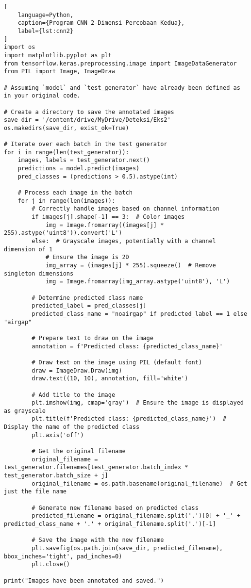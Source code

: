 \begin{lstlisting}[
    language=Python,
    caption={Program CNN 2-Dimensi Percobaan Kedua},
    label={lst:cnn2}
]
import os
import matplotlib.pyplot as plt
from tensorflow.keras.preprocessing.image import ImageDataGenerator
from PIL import Image, ImageDraw

# Assuming `model` and `test_generator` have already been defined as in your original code.

# Create a directory to save the annotated images
save_dir = '/content/drive/MyDrive/Deteksi/Eks2'
os.makedirs(save_dir, exist_ok=True)

# Iterate over each batch in the test generator
for i in range(len(test_generator)):
    images, labels = test_generator.next()
    predictions = model.predict(images)
    pred_classes = (predictions > 0.5).astype(int)

    # Process each image in the batch
    for j in range(len(images)):
        # Correctly handle images based on channel information
        if images[j].shape[-1] == 3:  # Color images
            img = Image.fromarray((images[j] * 255).astype('uint8')).convert('L')
        else:  # Grayscale images, potentially with a channel dimension of 1
            # Ensure the image is 2D
            img_array = (images[j] * 255).squeeze()  # Remove singleton dimensions
            img = Image.fromarray(img_array.astype('uint8'), 'L')

        # Determine predicted class name
        predicted_label = pred_classes[j]
        predicted_class_name = "noairgap" if predicted_label == 1 else "airgap"

        # Prepare text to draw on the image
        annotation = f'Predicted class: {predicted_class_name}'

        # Draw text on the image using PIL (default font)
        draw = ImageDraw.Draw(img)
        draw.text((10, 10), annotation, fill='white')

        # Add title to the image
        plt.imshow(img, cmap='gray')  # Ensure the image is displayed as grayscale
        plt.title(f'Predicted class: {predicted_class_name}')  # Display the name of the predicted class
        plt.axis('off')

        # Get the original filename
        original_filename = test_generator.filenames[test_generator.batch_index * test_generator.batch_size + j]
        original_filename = os.path.basename(original_filename)  # Get just the file name

        # Generate new filename based on predicted class
        predicted_filename = original_filename.split('.')[0] + '_' + predicted_class_name + '.' + original_filename.split('.')[-1]

        # Save the image with the new filename
        plt.savefig(os.path.join(save_dir, predicted_filename), bbox_inches='tight', pad_inches=0)
        plt.close()

print("Images have been annotated and saved.")
\end{lstlisting}

